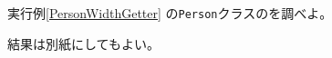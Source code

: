 \begin{Prob}\upshape\Must
 実行例\else\ref{PersonWidthGetter}\fi
 の\texttt{Person}クラスのを調べよ。
\end{Prob}
\ifText 結果は別紙にしてもよい。\vspace{0.15\textheight}\fi